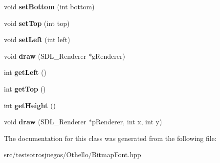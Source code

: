 \begin{DoxyCompactItemize}
\item 
void {\bfseries set\+Bottom} (int bottom)\hypertarget{class_bitmap_font_renderer_a309059d65d1b9bc39aa0ff7106f6953f}{}\label{class_bitmap_font_renderer_a309059d65d1b9bc39aa0ff7106f6953f}

\item 
void {\bfseries set\+Top} (int top)\hypertarget{class_bitmap_font_renderer_a86a56db51e9b5f0c88b867231668ca00}{}\label{class_bitmap_font_renderer_a86a56db51e9b5f0c88b867231668ca00}

\item 
void {\bfseries set\+Left} (int left)\hypertarget{class_bitmap_font_renderer_a9894805617288d3f5b652dcc30ab5f45}{}\label{class_bitmap_font_renderer_a9894805617288d3f5b652dcc30ab5f45}

\item 
void {\bfseries draw} (S\+D\+L\+\_\+\+Renderer $\ast$g\+Renderer)\hypertarget{class_bitmap_font_renderer_a5b6268da07617eb4af60dd5c29e3c0ba}{}\label{class_bitmap_font_renderer_a5b6268da07617eb4af60dd5c29e3c0ba}

\item 
int {\bfseries get\+Left} ()\hypertarget{class_bitmap_font_renderer_a9a46c5f2dc06587090df845a1a025cfc}{}\label{class_bitmap_font_renderer_a9a46c5f2dc06587090df845a1a025cfc}

\item 
int {\bfseries get\+Top} ()\hypertarget{class_bitmap_font_renderer_aa4944663fb8a76418ebbbf90293b7bf0}{}\label{class_bitmap_font_renderer_aa4944663fb8a76418ebbbf90293b7bf0}

\item 
int {\bfseries get\+Height} ()\hypertarget{class_bitmap_font_renderer_a1f3af2d5ee811b92b0974d667bea5f02}{}\label{class_bitmap_font_renderer_a1f3af2d5ee811b92b0974d667bea5f02}

\item 
void {\bfseries draw} (S\+D\+L\+\_\+\+Renderer $\ast$p\+Renderer, int x, int y)\hypertarget{class_bitmap_font_renderer_a1d64e6aeb450d94e7f32f1634a4c9d5e}{}\label{class_bitmap_font_renderer_a1d64e6aeb450d94e7f32f1634a4c9d5e}

\end{DoxyCompactItemize}


The documentation for this class was generated from the following file\+:\begin{DoxyCompactItemize}
\item 
src/testsotrosjuegos/\+Othello/Bitmap\+Font.\+hpp\end{DoxyCompactItemize}
